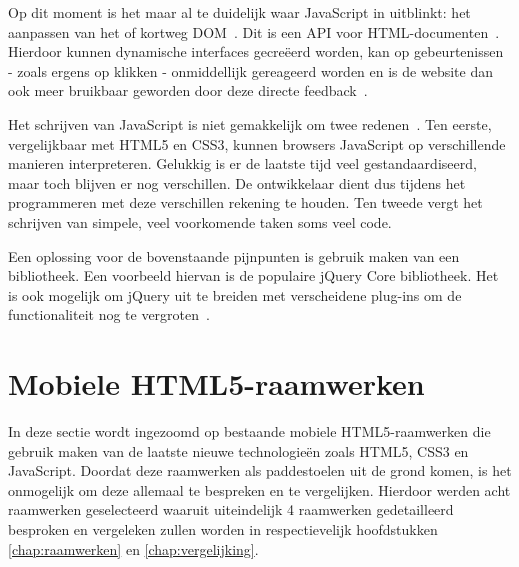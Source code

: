 Op dit moment is het maar al te duidelijk waar JavaScript in uitblinkt: het aanpassen van het  of kortweg DOM~\cite{PhilDutson2012}. 
Dit is een API voor HTML-documenten~\cite{Hegaret2004}. 
Hierdoor kunnen dynamische interfaces gecreëerd worden, kan op gebeurtenissen - zoals ergens op klikken - onmiddellijk gereageerd worden en is de website dan ook meer bruikbaar geworden door deze directe feedback~\cite{McFarland2011}.

Het schrijven van JavaScript is niet gemakkelijk om twee redenen~\cite{McFarland2011}. 
Ten eerste, vergelijkbaar met HTML5 en CSS3, kunnen browsers JavaScript op verschillende manieren interpreteren. 
Gelukkig is er de laatste tijd veel gestandaardiseerd, maar toch blijven er nog verschillen. %
De ontwikkelaar dient dus tijdens het programmeren met deze verschillen rekening te houden. 
Ten tweede vergt het schrijven van simpele, veel voorkomende taken soms veel code.

Een oplossing voor de bovenstaande pijnpunten is gebruik maken van een bibliotheek. 
Een voorbeeld hiervan is de populaire jQuery Core bibliotheek. 
Het is ook mogelijk om jQuery uit te breiden met verscheidene plug-ins om de functionaliteit nog te vergroten~\cite{McFarland2011}.



\section{Mobiele HTML5-raamwerken}
\label{sec:mobiele-html5-raamwerken}

In deze sectie wordt ingezoomd op bestaande mobiele HTML5-raamwerken die gebruik maken van de laatste nieuwe technologieën zoals HTML5, CSS3 en JavaScript.
Doordat deze raamwerken als paddestoelen uit de grond komen, is het onmogelijk om deze allemaal te bespreken en te vergelijken.
Hierdoor werden acht raamwerken geselecteerd waaruit uiteindelijk 4 raamwerken gedetailleerd besproken en vergeleken zullen worden in respectievelijk hoofdstukken \ref{chap:raamwerken} en \ref{chap:vergelijking}.

